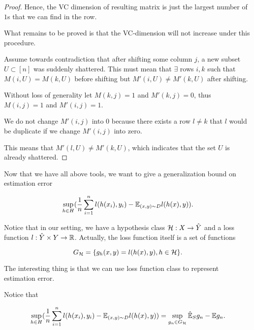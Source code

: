 \documentclass[../main.tex]{subfiles}
\begin{document}
\begin{proof}
		Hence, the VC dimension of resulting matrix is just the largest number of $1$s that we can find in the row.
		
		What remains to be proved is that the VC-dimension will not increase under this procedure.
		
		Assume towards contradiction that after shifting some column $j$, a new subset $U\subset [n]$ was suddenly shattered. This must mean that $\exists$ rows $i,k$ such that $M(i,U) = M(k,U)$ before shifting but $M'(i,U) \neq M'(k,U)$ after shifting.
		
		Without loss of generality let $M(k,j) = 1$ and $M'(k,j) = 0$, thus $M(i,j) = 1$ and $M'(i,j) = 1$.
		
		We do not change $M'(i,j)$ into $0$ because there exists a row $l\neq k$ that $l$ would be duplicate if we change $M'(i,j)$ into zero. 
		
		This means that $M'(l, U) \neq M'(k,U)$, which indicates that the set $U$ is already shattered.
		

		\end{proof}
		
		 Now that we have all above tools, we want to give a generalization bound on estimation error 
		 
		 \begin{equation*}
		 		 \sup\limits_{h\in H}(\frac{1}{n} \sum\limits_{i=1}^n l(h(x_i),y_i) - \mathbb{E}_{(x,y)\sim D} l(h(x),y)).
		 \end{equation*}
		 
		 Notice that in our setting, we have a hypothesis class $\mathcal{H}: X \to \hat{Y}$ and a loss function $l: \hat{Y} \times Y \to \mathbb{R}$. Actually, the loss function itself is a set of functions 
		 
		 \begin{equation*}
		 	G_{\mathcal{H}} = \{g_h(x,y) = l(h(x),y), h\in \mathcal{H}\}.
		 \end{equation*}
		
		 The interesting thing is that we can use loss function class to represent estimation error.
		 
		 Notice that 
		 
		 \begin{equation*}
		 \begin{aligned}
		  \sup\limits_{h\in H}(\frac{1}{n} \sum\limits_{i=1}^n l(h(x_i),y_i) - \mathbb{E}_{(x,y)\sim D} l(h(x),y)) = \sup\limits_{g_n \in G_{\mathcal{H}}} \hat{\mathbb{E}}_S g_n - \mathbb{E} g_n.
 		 \end{aligned}
		 \end{equation*}
		 
\end{document}
